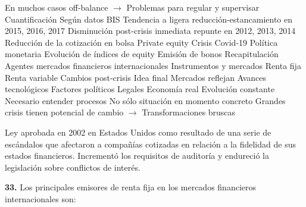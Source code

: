 \documentclass{nuevotema}
\begin{document}
\begin{esquemal}
				\4[] En muchos casos off-balance
				\4[] $\to$ Problemas para regular y supervisar
			\3 Cuantificación
				\4 Según datos BIS
				\4 Tendencia a ligera reducción-estancamiento en 2015, 2016, 2017
				\4 Disminución post-crisis inmediata
				\4[] repunte en 2012, 2013, 2014
		\2 Reducción de la cotización en bolsa
		\2 Private equity
		\2 Crisis Covid-19
			\3 Política monetaria
			\3 Evolución de índices de equity
			\3 Emisión de bonos
	\1[] 
		\2 Recapitulación
			\3 Agentes mercados financieros internacionales
			\3 Instrumentos y mercados
				\4 Renta fija
				\4 Renta variable
			\3 Cambios post-crisis
		\2 Idea final
			\3 Mercados reflejan
				\4 Avances tecnológicos
				\4 Factores políticos
				\4 Legales
				\4 Economía real
			\3 Evolución constante
				\4 Necesario entender procesos
				\4 No sólo situación en momento concreto
				\4 Grandes crisis tienen potencial de cambio
				\4[] $\to$ Transformaciones bruscas
                
\end{esquemal}









































\conceptos


Ley aprobada en 2002 en Estados Unidos como resultado de una serie de escándalos que afectaron a compañías cotizadas en relación a la fidelidad de sus estados financieros. Incrementó los requisitos de auditoría y endureció la legislación sobre conflictos de interés.

\preguntas


\textbf{33.} Los principales emisores de renta fija en los mercados financieros internacionales son:
\end{document}
